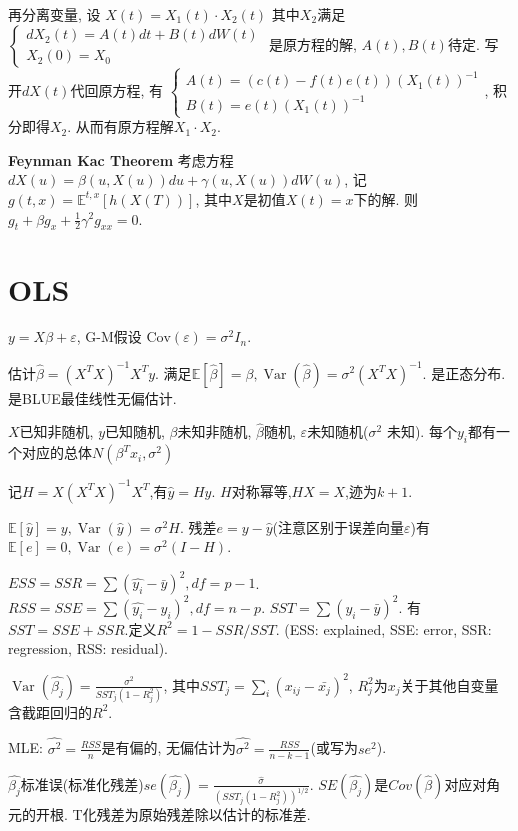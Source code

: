 \documentclass[UTF8]{ctexart}
\begin{document}
再分离变量, 设 $X(t)=X_1(t) \cdot X_2(t)$ 其中$X_2$满足 $\left\{\begin{array}{l}d X_2(t)=A(t) d t+B(t) d W(t) \\ X_2(0)=X_0\end{array}\right.$
是原方程的解, $A(t),B(t)$待定.
写开$dX(t)$代回原方程, 有
$\left\{\begin{array}{l}
		A(t)=(c(t)-f(t) e(t))\left(X_1(t)\right)^{-1} \\
		B(t)=e(t)\left(X_1(t)\right)^{-1}
	\end{array}\right.$, 积分即得$X_2$. 从而有原方程解$X_1\cdot X_2$.

\textbf{Feynman Kac Theorem}
考虑方程 $dX(u)=\beta(u,X(u))du+\gamma(u,X(u))dW(u)$,
记$g(t,x)=\mathbb{E}^{t,x}[h(X(T))]$, 其中$X$是初值$X(t)=x$下的解.
则$g_t+\beta g_x+\frac12 \gamma^2 g_{xx}=0$.

\section{OLS}
$y=X\beta+\varepsilon$, G-M假设 $\text{Cov}(\varepsilon)=\sigma ^2 I_n$.

估计$\hat{\beta}=(X^TX)^{-1}X^Ty$.
满足$\mathbb{E}[\hat{\beta}]=\beta, \operatorname{Var}(\hat{\beta})=\sigma^2(X^TX)^{-1}$.
是正态分布.
是BLUE最佳线性无偏估计.

$X$已知非随机, $y$已知随机, $\beta$未知非随机, $\hat{\beta}$随机, $\varepsilon$未知随机($\sigma^2$ 未知).
每个$y_i$都有一个对应的总体$N(\beta^T x_i, \sigma^2)$

记$H=X(X^TX)^{-1}X^T$,有$\hat{y}=Hy$. $H$对称幂等,$HX=X$,迹为$k+1$.

$\mathbb{E}[\hat{y}]=y, \operatorname{Var}(\hat{y})=\sigma^2H$.
残差$e=y-\hat{y}$(注意区别于误差向量$\varepsilon$)有
$\mathbb{E}[e]=0, \operatorname{Var}(e)=\sigma^2 (I-H)$.

$ESS = SSR = \sum (\hat{y_i}-\bar{y})^2, df=p-1$.
$RSS = SSE = \sum (\hat{y_i}-y_i)^2, df=n-p$.
$SST = \sum (y_i-\bar{y})^2$.
有$SST=SSE+SSR$.定义$R^2=1-SSR/SST$.
(ESS: explained, SSE: error, SSR: regression, RSS: residual).

$\operatorname{Var}(\hat{\beta_j}) = \frac{\sigma^2}{SST_j(1-R_j^2)}$,
其中$SST_j=\sum_i (x_{ij}-\bar{x_j})^2$, $R_j^2$为$x_j$关于其他自变量含截距回归的$R^2$.

MLE: $\hat{\sigma^2}=\frac{RSS}{n}$是有偏的,
无偏估计为$\hat{\sigma^2}=\frac{RSS}{n-k-1}$(或写为$se^2$).

$\hat{\beta_j}$标准误(标准化残差)$se(\hat{\beta_j}) = \frac{\hat{\sigma}}{(SST_j(1-R_j^2))^{1/2}}$.
$SE(\hat{\beta_j})$是$Cov(\hat{\beta})$对应对角元的开根.
T化残差为原始残差除以估计的标准差.
\end{document}

